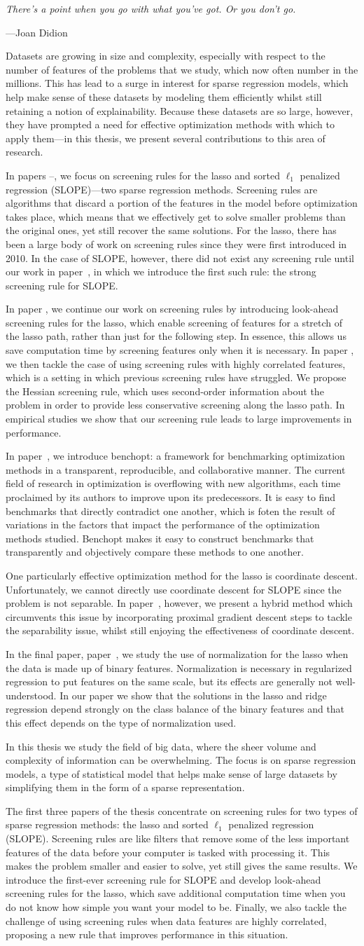 \documentclass{book}
\newcommand{\myAbstract}{%
  Datasets are growing in size and complexity, especially with respect to the number of features of the problems that we study, which now often number in the millions. This has lead to a surge in interest for sparse regression models, which help make sense of these datasets by modeling them efficiently whilst still retaining a notion of explainability. Because these datasets are so large, however, they have prompted a need for effective optimization methods with which to apply them---in this thesis, we present several contributions to this area of research.

  In papers \I--\III, we focus on screening rules for the lasso and sorted \(\ell_1\) penalized regression (SLOPE)---two sparse regression methods. Screening rules are algorithms that discard a portion of the features in the model before optimization takes place, which means that we effectively get to solve smaller problems than the original ones, yet still recover the same solutions. For the lasso, there has been a large body of work on screening rules since they were first introduced in 2010. In the case of SLOPE, however, there did not exist any screening rule until our work in paper~\I, in which we introduce the first such rule: the strong screening rule for SLOPE.

  In paper \II, we continue our work on screening rules by introducing look-ahead screening rules for the lasso, which enable screening of features for a stretch of the lasso path, rather than just for the following step. In essence, this allows us save computation time by screening features only when it is necessary. In paper \III, we then tackle the case of using screening rules with highly correlated features, which is a setting in which previous screening rules have struggled. We propose the Hessian screening rule, which uses second-order information about the problem in order to provide less conservative screening along the lasso path. In empirical studies we show that our screening rule leads to large improvements in performance.

  In paper~\IV, we introduce benchopt: a framework for benchmarking optimization methods in a transparent, reproducible, and collaborative manner. The current field of research in optimization is overflowing with new algorithms, each time proclaimed by its authors to improve upon its predecessors. It is easy to find benchmarks that directly contradict one another, which is foten the result of variations in the factors that impact the performance of the optimization methods studied. Benchopt makes it easy to construct benchmarks that transparently and objectively compare these methods to one another.

  One particularly effective optimization method for the lasso is coordinate descent. Unfortunately, we cannot directly use coordinate descent for SLOPE since the problem is not separable. In paper~\V, however, we present a hybrid method which circumvents this issue by incorporating proximal gradient descent steps to tackle the separability issue, whilst still enjoying the effectiveness of coordinate descent.

  In the final paper, paper~\VI, we study the use of normalization for the lasso when the data is made up of binary features. Normalization is necessary in regularized regression to put features on the same scale, but its effects are generally not well-understood. In our paper we show that the solutions in the lasso and ridge regression depend strongly on the class balance of the binary features and that this effect depends on the type of normalization used.
}%
\begin{document}

\pagestyle{empty}




\newpage
\thispagestyle{empty} %

\setlength\epigraphrule{0pt}
\setlength{}

\null
\vspace{20ex}


\epigraph{\itshape
  There’s a point when you go with what you’ve got. Or you don’t go.
}{
  ---Joan Didion
}

\cleardoublepage

\pagestyle{fancy}

\setcounter{page}{1} %
\setcounter{tocdepth}{1}

{\hypersetup{hidelinks}\tableofcontents}


\newpage


\newpage


\myAbstract


In this thesis we study the field of big data, where the sheer volume and complexity of information can be overwhelming. The focus is on sparse regression models, a type of statistical model that helps make sense of large datasets by simplifying them in the form of a sparse  representation.

The first three papers of the thesis concentrate on screening rules for two types of sparse regression methods: the lasso and sorted \(\ell_1\) penalized regression (SLOPE). Screening rules are like filters that remove some of the less important features of the data before your computer is tasked with processing it. This makes the problem smaller and easier to solve, yet still gives the same results. We introduce the first-ever screening rule for SLOPE and develop look-ahead screening rules for the lasso, which save additional computation time when you do not know how simple you want your model to be. Finally, we also tackle the challenge of using screening rules when data features are highly correlated, proposing a new rule that improves performance in this situation.
\end{document}

